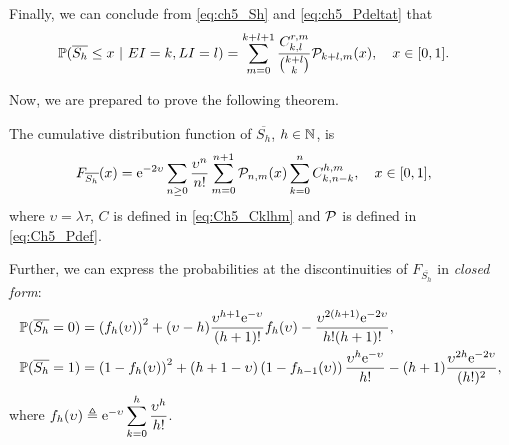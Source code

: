Finally, we can conclude from \eqref{eq:ch5_Sh} and \eqref{eq:ch5_Pdeltat} that
\begin{align} \label{eq:Ch5_Sh_EIEL}
    \P(\overline{S_h} \leq x~|~EI=k,LI=l) 
	    &= \sum_{m=0}^{k+l+1} \dfrac{C_{k,l}^{r,m}}{\binom{k+l}{k}} \cal{P}_{k+l,m}(x), \quad x\in[0,1].
\end{align}

Now, we are prepared to prove the following theorem.
\begin{theorem} \label{th:F_Sh}
    The cumulative distribution function of $\overline{S_h}$, $h\in\N$, is
    \begin{align*}
        F_{\overline{S_h}}(x)
            &= \euler^{-2\upsilon} \sum_{n \geq 0} \frac{\upsilon^n}{n!} \sum_{m=0}^{n+1}  \cal{P}_{n,m}(x) \sum_{k=0}^n C^{h,m}_{k,n-k}, \quad x\in[0,1],
    \end{align*}
    where $\upsilon = \lambda\tau$, $C$ is defined in \eqref{eq:Ch5_Cklhm} and $\cal{P}$ is defined in \eqref{eq:Ch5_Pdef}.
    
    Further, we can express the probabilities at the discontinuities of $F_{\overline{S_h}}$ in \textit{closed form}:
    \begin{align*}
        \P(\overline{S_h}=0) 
            &= \left( f_{h}(\upsilon) \right)^2 + (\upsilon-h) \frac{\upsilon^{h+1}\euler^{-\upsilon}}{(h+1)!} f_{h}(\upsilon)  - \dfrac{\upsilon^{2(h+1)}\euler^{-2 \upsilon}}{h!(h+1)!},\\
        \P(\overline{S_h}=1) 
            &= \left( 1 - f_{h}(\upsilon) \right)^2 + (h+1-\upsilon) \left( 1 - f_{h-1}(\upsilon) \right) \frac{\upsilon^h \euler^{-\upsilon}}{h!} -(h+1)\frac{\upsilon^{2h}\euler^{-2\upsilon}}{(h!)^2},
    \end{align*}
    where $f_h(\upsilon)\triangleq \euler^{-\upsilon}\displaystyle\sum_{k=0}^{h}\frac{\upsilon^h}{h!}$.
\end{theorem}
